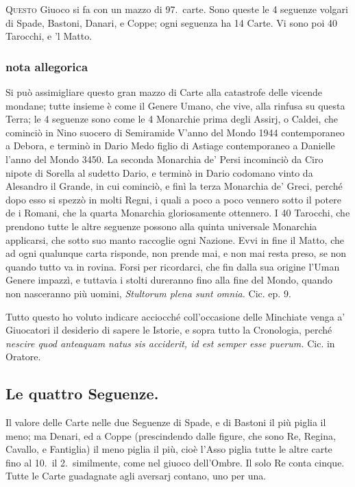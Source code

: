 \documentclass[11pt,a6paper]{article}
\begin{document}
\lettrine{Q}{uesto} Giuoco si fa con un
mazzo di 97.\ carte. Sono
queste le 4 seguenze volgari di Spade,
Bastoni, Danari, e Coppe;
ogni seguenza ha 14 Carte. Vi sono
poi 40 Tarocchi, e 'l Matto.

\subsubsection{nota allegorica}
{\footnotesize
Si può assimigliare questo gran mazzo di Carte
alla catastrofe delle vicende mondane; tutte
insieme è come il Genere Umano, che vive, alla rinfusa
su questa Terra; le 4 seguenze sono come le 4
Monarchie prima degli Assirj, o Caldei, che cominciò
in Nino suocero di Semiramide V'anno del
Mondo 1944 contemporaneo a Debora, e terminò in
Dario Medo figlio di Astiage contemporaneo a
Danielle l'anno del Mondo 3450. La seconda
Monarchia de' Persi incominciò da Ciro nipote di Sorella
al sudetto Dario, e terminò in Dario codomano
vinto da Alesandro il Grande, in cui cominciò, e
finì la terza Monarchia de' Greci, perché dopo esso
si spezzò in molti Regni, i quali a poco a poco
vennero sotto il potere de i Romani, che la quarta
Monarchia gloriosamente ottennero. I 40 Tarocchi,
che prendono tutte le altre seguenze possono alla
quinta universale Monarchia applicarsi, che sotto
suo manto raccoglie ogni Nazione. Evvi in fine il
Matto, che ad ogni qualunque carta risponde, non
prende mai, e non mai resta preso, se non quando
tutto va in rovina. Forsi per ricordarci, che fin
dalla sua origine l'Uman Genere impazzì, e
tuttavia i stolti dureranno fino alla fine del Mondo,
quando non nasceranno più uomini, \textit{Stultorum
plena sunt omnia.} Cic. ep. 9.

Tutto questo ho voluto indicare acciocché
coll'occasione delle Minchiate
venga a' Giuocatori il
desiderio di sapere le Istorie, e sopra
tutto la Cronologia, perché \textit{nescire quod
anteaquam natus sis acciderit,
id est semper esse puerum.} Cic. in
Oratore.
}
\subsection{Le quattro Seguenze.}

Il valore delle Carte nelle due Seguenze
di Spade, e di Bastoni il più piglia il
meno; ma Denari, ed a Coppe (prescindendo
dalle figure, che sono Re, Regina,
Cavallo, e Fantiglia) il meno piglia il
più, cioè
l'Asso piglia tutte le altre carte fino
al 10.~il 2.~similmente, come nel giuoco
dell'Ombre. Il solo Re conta cinque.
Tutte le Carte guadagnate agli aversarj contano,
uno per una.
\end{document}
